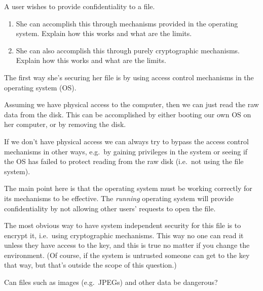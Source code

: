 \begin{frame}
  \begin{exercise}
    A user wishes to provide confidentiality to a file.
    \begin{enumerate}
      \item She can accomplish this through mechanisms provided in the operating 
        system.
        Explain how this works and what are the limits.

      \item She can also accomplish this through purely cryptographic mechanisms.
        Explain how this works and what are the limits.
    \end{enumerate}
  \end{exercise}
\end{frame}

\begin{frame}
  \begin{solution}
    The first way she's securing her file is by using access control mechanisms 
    in the operating system (OS).

    Assuming we have physical access to the computer, then we can just read the 
    raw data from the disk.
    This can be accomplished by either booting our own OS on her computer, or 
    by removing the disk.

    If we don't have physical access we can always try to bypass the access 
    control mechanisms in other ways, e.g.\ by gaining privileges in the system 
    or seeing if the OS has failed to protect reading from the raw disk (i.e.\ 
    not using the file system).

    The main point here is that the operating system must be working correctly 
    for its mechanisms to be effective.
    The \emph{running} operating system will provide confidentiality by not 
    allowing other users' requests to open the file.

    The most obvious way to have system independent security for this file is 
    to encrypt it, i.e.~using cryptographic mechanisms.
    This way no one can read it unless they have access to the key, and this is 
    true no matter if you change the environment.
    (Of course, if the system is untrusted someone can get to the key that way, 
    but that's outside the scope of this question.)
  \end{solution}
\end{frame}


  
\begin{frame}
  \begin{exercise}
    Can files such as images (e.g.\ JPEGs) and other data be dangerous?
  \end{exercise}
\end{frame}

